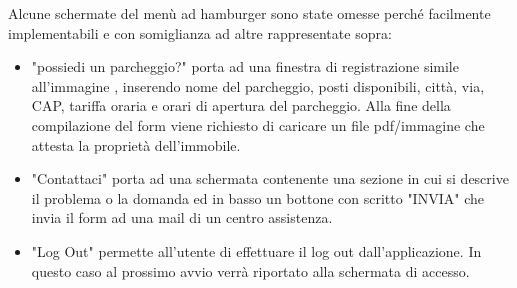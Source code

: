 \pagebreak
Alcune schermate del menù ad hamburger sono state omesse perché facilmente implementabili e con somiglianza ad altre rappresentate sopra:
\begin{itemize}
    \item "possiedi un parcheggio?" porta ad una finestra di registrazione simile all'immagine , inserendo nome del parcheggio, posti disponibili, città, via, CAP, tariffa oraria e orari di apertura del parcheggio. Alla fine della compilazione del form viene richiesto di caricare un file pdf/immagine che attesta la proprietà dell'immobile.
    \item "Contattaci" porta ad una schermata contenente una sezione in cui si descrive il problema o la domanda ed in basso un bottone con scritto "INVIA" che invia il form ad una mail di un centro assistenza.
    \item "Log Out" permette all'utente di effettuare il log out dall'applicazione. In questo caso al prossimo avvio verrà riportato alla schermata di accesso.
\end{itemize}